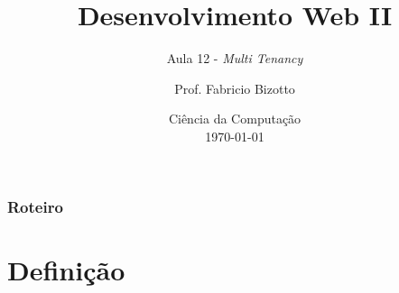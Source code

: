\documentclass[
	9pt, %
	t, %
]{beamer}
\title[DesWebII]{Desenvolvimento Web II} %
\subtitle{Aula 12 - \textit{Multi Tenancy}} %
\author[Fabricio Bizotto]{Prof. Fabricio Bizotto} %
\institute[IFC]{Instituto Federal Catarinense \\ \smallskip \textit{fabricio.bizotto@ifc.edu.br}} %
\date[\today]{Ciência da Computação \\ \today} %
\begin{document}

\begin{frame}
	\titlepage %
\end{frame}


\begin{frame}
	\frametitle{Roteiro} %
	
	\tableofcontents %
\end{frame}


\section{Definição}
\end{document}
